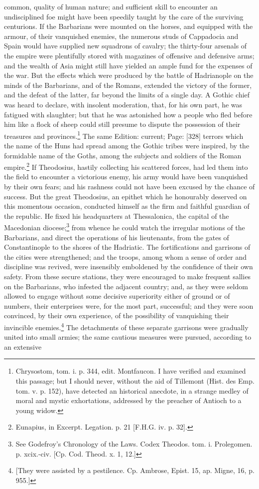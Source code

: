 common, quality of human nature; and sufficient skill to encounter an undisciplined foe might have been speedily taught by the care of the surviving centurions. If the Barbarians were mounted on the horses, and equipped with the armour, of their vanquished enemies, the numerous studs of Cappadocia and Spain would have supplied new squadrons of cavalry; the thirty-four arsenals of the empire were plentifully stored with magazines of offensive and defensive arms; and the wealth of Asia might still have yielded an ample fund for the expenses of the war. But the effects which were produced by the battle of Hadrianople on the minds of the Barbarians, and of the Romans, extended the victory of the former, and the defeat of the latter, far beyond the limits of a single day. A Gothic chief was heard to declare, with insolent moderation, that, for his own part, he was fatigued with slaughter; but that he was astonished how a people who fled before him like a flock of sheep could still presume to dispute the possession of their treasures and provinces.\footnote{Chrysostom, tom. i. p. 344, edit. Montfaucon. I have verified and examined this passage; but I should never, without the aid of Tillemont (Hist. des Emp. tom. v. p. 152), have detected an historical anecdote, in a strange medley of moral and mystic exhortations, addressed by the preacher of Antioch to a young widow.} The same Edition: current; Page: [328] terrors which the name of the Huns had spread among the Gothic tribes were inspired, by the formidable name of the Goths, among the subjects and soldiers of the Roman empire.\footnote{Eunapius, in Excerpt. Legation. p. 21 [F.H.G. iv. p. 32].} If Theodosius, hastily collecting his scattered forces, had led them into the field to encounter a victorious enemy, his army would have been vanquished by their own fears; and his rashness could not have been excused by the chance of success. But the great Theodosius, an epithet which he honourably deserved on this momentous occasion, conducted himself as the firm and faithful guardian of the republic. He fixed his headquarters at Thessalonica, the capital of the Macedonian diocese;\footnote{See Godefroy\texthebrew{}’s Chronology of the Laws. Codex Theodos. tom. i. Prolegomen. p. xcix.-civ. [Cp. Cod. Theod. x. 1, 12.]} from whence he could watch the irregular motions of the Barbarians, and direct the operations of his lieutenants, from the gates of Constantinople to the shores of the Hadriatic. The fortifications and garrisons of the cities were strengthened; and the troops, among whom a sense of order and discipline was revived, were insensibly emboldened by the confidence of their own safety. From these secure stations, they were encouraged to make frequent sallies on the Barbarians, who infested the adjacent country; and, as they were seldom allowed to engage without some decisive superiority either of ground or of numbers, their enterprises were, for the most part, successful; and they were soon convinced, by their own experience, of the possibility of vanquishing their invincible enemies.\footnote{[They were assisted by a pestilence. Cp. Ambrose, Epist. 15, ap. Migne, 16, p. 955.]} The detachments of these separate garrisons were gradually united into small armies; the same cautious measures were pursued, according to an extensive 